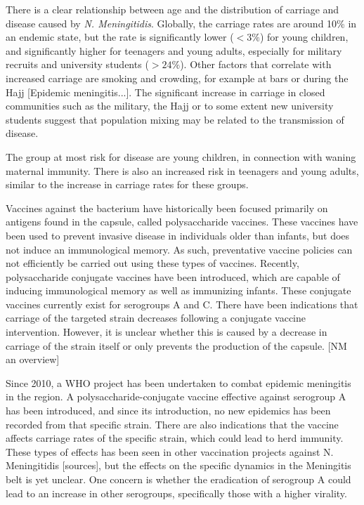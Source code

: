 \documentclass[10pt,a4paper]{article}
\begin{document}
There is a clear relationship between age and the distribution of carriage and disease caused by \emph{N. Meningitidis}. Globally, the carriage rates are around 10\% in an endemic state, but the rate is significantly lower ($<3\%$) for young children, and significantly higher for teenagers and young adults, especially for military recruits and university students ($>24\%$). Other factors that correlate with increased carriage are smoking and crowding, for example at bars or during the Hajj [Epidemic meningitis...]. The significant increase in carriage in closed communities such as the military, the Hajj or to some extent new university students suggest that population mixing may be related to the transmission of disease.

The group at most risk for disease are young children, in connection with waning maternal immunity. There is also an increased risk in teenagers and young adults, similar to the increase in carriage rates for these groups.

Vaccines against the bacterium have historically been focused primarily on antigens found in the capsule, called polysaccharide vaccines. These vaccines have been used to prevent invasive disease in individuals older than infants, but does not induce an immunological memory. As such, preventative vaccine policies can not efficiently be carried out using these types of vaccines. Recently, polysaccharide conjugate vaccines have been introduced, which are capable of inducing immunological memory as well as immunizing infants. These conjugate vaccines currently exist for serogroups A and C. There have been indications that carriage of the targeted strain decreases following a conjugate vaccine intervention. However, it is unclear whether this is caused by a decrease in carriage of the strain itself or only prevents the production of the capsule. [NM an overview]

Since 2010, a WHO project has been undertaken to combat epidemic meningitis in the region. A polysaccharide-conjugate vaccine effective against serogroup A has been introduced, and since its introduction, no new epidemics has been recorded from that specific strain. There are also indications that the vaccine affects carriage rates of the specific strain, which could lead to herd immunity. These types of effects has been seen in other vaccination projects against N. Meningitidis [sources], but the effects on the specific dynamics in the Meningitis belt is yet unclear. One concern is whether the eradication of serogroup A could lead to an increase in other serogroups, specifically those with a higher virality.
\end{document}
